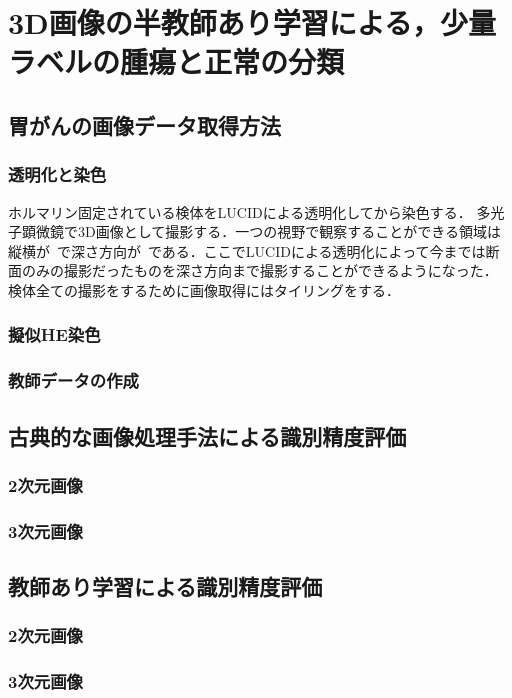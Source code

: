 \chapter{3D画像の半教師あり学習による，少量ラベルの腫瘍と正常の分類}

\section{胃がんの画像データ取得方法}

\subsection{透明化と染色}
ホルマリン固定されている検体をLUCIDによる透明化してから染色する．
多光子顕微鏡で3D画像として撮影する．一つの視野で観察することができる領域は縦横が~で深さ方向が~である．ここでLUCIDによる透明化によって今までは断面のみの撮影だったものを深さ方向まで撮影することができるようになった．
検体全ての撮影をするために画像取得にはタイリングをする．

\subsection{擬似HE染色}

\subsection{教師データの作成}

\section{古典的な画像処理手法による識別精度評価}
\subsection{2次元画像}
\subsection{3次元画像}

\section{教師あり学習による識別精度評価}
\subsection{2次元画像}
\subsection{3次元画像}

